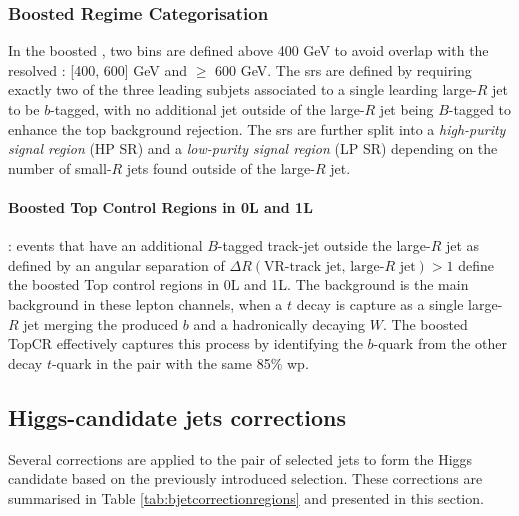 \subsubsection{Boosted Regime Categorisation}
In the boosted \vhb, two \ptv bins are defined above 400 GeV to avoid overlap with the resolved \vhb: [400, 600] GeV and $\geq$ 600 GeV. The \gls{sr}s are defined by requiring exactly two of the three leading subjets associated to a single learding large-$R$ jet to be $b$-tagged, with no additional jet outside of the large-$R$ jet being $B$-tagged to enhance the top background rejection. The \gls{sr}s are further split into a \textit{high-purity signal region} (HP SR) and a \textit{low-purity signal region} (LP SR) depending on the number of small-$R$ jets found outside of the large-$R$ jet.  

\paragraph{Boosted Top Control Regions in 0L and 1L}: events that have an additional $B$-tagged track-jet outside the large-$R$ jet as defined by an angular separation of $\Delta R(\textrm{VR-track jet, large-}R\textrm{ jet}) > 1$
define the boosted Top control regions in 0L and 1L. The \ttb background is the main background in these lepton channels, when a $t$ decay is capture as a single large-$R$ jet merging the produced $b$ and a hadronically decaying $W$. The boosted TopCR effectively captures this process by identifying the $b$-quark from the other decay $t$-quark in the \ttb pair with the same 85\% \gls{wp}.\\

\subsection{Higgs-candidate jets corrections}
Several corrections are applied to the pair of selected jets to form the Higgs candidate based on the previously introduced selection. These corrections are summarised in Table \ref{tab:bjetcorrectionregions} and presented in this section.



